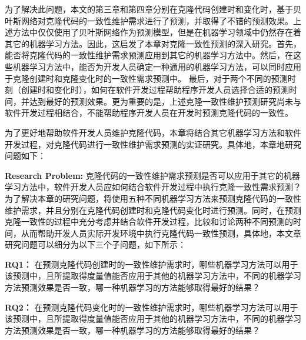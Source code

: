 为了解决此问题，本文的第三章和第四章分别在克隆代码创建时和变化时，基于贝叶斯网络对克隆代码的一致性维护需求进行了预测，并取得了不错的预测效果。上述方法中仅仅使用了贝叶斯网络作为预测模型，但是在机器学习领域中仍然存在着其它的机器学习方法。因此，这启发了本章对克隆一致性预测的深入研究。首先，能否将克隆代码的一致性维护需求预测应用到其它的机器学习方法中。然后，在这些机器学习方法中，能否为开发人员确定一种通用的机器学习方法，可以同时应用于克隆创建时和克隆变化时的一致性需求预测中。 最后，对于两个不同的预测时刻（创建时和变化时），如何在软件开发过程帮助程序开发人员选择合适的预测时间，并达到最好的预测效果。更为重要的是，上述克隆一致性维护预测研究尚未与软件开发过程相结合，不能帮助程序开发人员在开发时预测克隆代码的一致性。

为了更好地帮助软件开发人员维护克隆代码，本章将结合其它机器学习方法和软件开发过程，对克隆代码进行一致性维护需求预测的实证研究。具体地，本章地研究问题如下：

{\bf Research Problem:} 克隆代码的一致性维护需求预测是否可以应用于其它的机器学习方法中，软件开发人员应如何结合软件开发过程中执行克隆一致性需求预测？\\

为了解决本章的研究问题，将使用五种不同机器学习方法来预测克隆代码的一致性维护需求，并且分别在克隆代码创建时和克隆代码变化时进行预测。同时，在预测克隆一致性的过程中充分考虑并结合软件开发过程，比较和讨论两种不同预测的时间，从而帮助开发人员实际开发环境中执行克隆代码一致性预测，具体地，本文章研究问题可以细分为以下三个子问题，如下所示：

{\bf RQ1：}
在预测克隆代码创建时的一致性维护需求时，哪些机器学习方法可以用于该预测中，且所提取得度量值能否应用于其他的机器学习方法中，不同的机器学习方法预测效果是否一致，哪一种机器学习的方法能够取得最好的结果？

{\bf RQ2：}
在预测克隆代码变化时的一致性维护需求时，哪些机器学习方法可以用于该预测中，且所提取得度量值能否应用于其他的机器学习方法中，不同的机器学习方法预测效果是否一致，哪一种机器学习的方法能够取得最好的结果？

